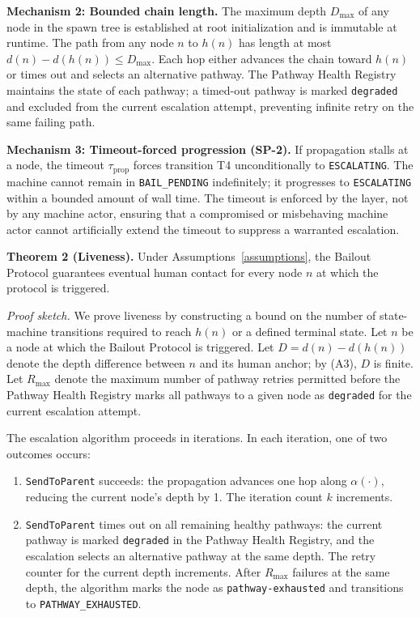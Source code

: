 \textbf{Mechanism 2: Bounded chain length.} The maximum depth $D_{\max}$ of any node in the spawn tree is established at root initialization and is immutable at runtime. The path from any node $n$ to $h(n)$ has length at most $d(n) - d(h(n)) \leq D_{\max}$. Each hop either advances the chain toward $h(n)$ or times out and selects an alternative pathway. The Pathway Health Registry maintains the state of each pathway; a timed-out pathway is marked \texttt{degraded} and excluded from the current escalation attempt, preventing infinite retry on the same failing path.

\textbf{Mechanism 3: Timeout-forced progression (SP-2).} If propagation stalls at a node, the timeout $\tau_{\text{prop}}$ forces transition T4 unconditionally to \texttt{ESCALATING}. The machine cannot remain in \texttt{BAIL\_PENDING} indefinitely; it progresses to \texttt{ESCALATING} within a bounded amount of wall time. The timeout is enforced by the \fact{} layer, not by any machine actor, ensuring that a compromised or misbehaving machine actor cannot artificially extend the timeout to suppress a warranted escalation.

\begin{tcolorbox}[colback=gray!5, colframe=gray!50, width=4.8in, before=\centering, after=\centering]
\begin{minipage}{4.6in}
\textbf{Theorem 2 (Liveness).} Under Assumptions~\ref{assumptions}, the Bailout Protocol guarantees eventual human contact for every node $n$ at which the protocol is triggered.
\end{minipage}
\end{tcolorbox}

\medskip
\textit{Proof sketch.} We prove liveness by constructing a bound on the number of state-machine transitions required to reach $h(n)$ or a defined terminal state. Let $n$ be a node at which the Bailout Protocol is triggered. Let $D = d(n) - d(h(n))$ denote the depth difference between $n$ and its human anchor; by (A3), $D$ is finite. Let $R_{\max}$ denote the maximum number of pathway retries permitted before the Pathway Health Registry marks all pathways to a given node as \texttt{degraded} for the current escalation attempt.

The escalation algorithm proceeds in iterations. In each iteration, one of two outcomes occurs:
\begin{enumerate}
\item[(a)] \texttt{SendToParent} succeeds: the propagation advances one hop along $\alpha(\cdot)$, reducing the current node's depth by 1. The iteration count $k$ increments.
\item[(b)] \texttt{SendToParent} times out on all remaining healthy pathways: the current pathway is marked \texttt{degraded} in the Pathway Health Registry, and the escalation selects an alternative pathway at the same depth. The retry counter for the current depth increments. After $R_{\max}$ failures at the same depth, the algorithm marks the node as \texttt{pathway-exhausted} and transitions to \texttt{PATHWAY\_EXHAUSTED}.
\end{enumerate}

